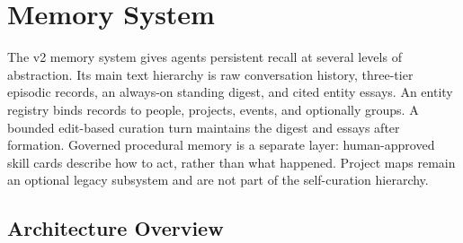 \documentclass[11pt,letterpaper]{report}
\begin{document}
\chapter{Memory System}
\label{ch:memory}

The v2 memory system gives agents persistent recall at several levels of
abstraction. Its main text hierarchy is raw conversation history,
three-tier episodic records, an always-on standing digest, and cited entity
essays. An entity registry binds records to people, projects, events, and
optionally groups. A bounded edit-based curation turn maintains the digest
and essays after formation. Governed procedural memory is a separate layer:
human-approved skill cards describe how to act, rather than what happened.
Project maps remain an optional legacy subsystem and are not part of the
self-curation hierarchy.

\section{Architecture Overview}
\end{document}
